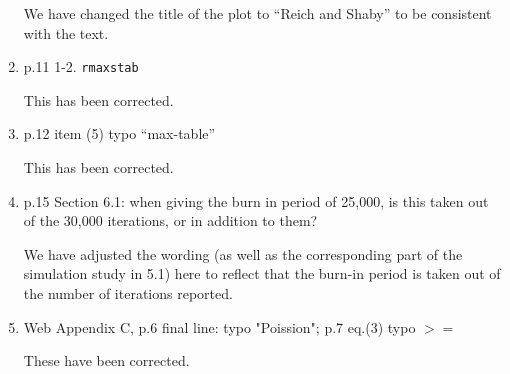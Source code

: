 \documentclass[11pt]{article}
\begin{document}
\begin{enumerate}[1.]
	\begin{response}
	We have changed the title of the plot to ``Reich and Shaby'' to be consistent with the text.
	\end{response}
	
	\item p.11 1-2. \texttt{rmaxstab}
	
	\begin{response}
	This has been corrected.
	\end{response}
	
	\item p.12 item (5) typo ``max-table''
	
	\begin{response}
	This has been corrected.
	\end{response}
	
	\item p.15 Section 6.1: when giving the burn in period of 25,000, is this taken out of the 30,000 iterations, or in addition to them?
	
	\begin{response}
	We have adjusted the wording (as well as the corresponding part of the simulation study in 5.1) here to reflect that the burn-in period is taken out of the number of iterations reported.
	\end{response}
	
	\item Web Appendix C, p.6 final line: typo "Poission"; p.7 eq.(3) typo $>=$
	
	\begin{response}
	These have been corrected.		
	\end{response}

\end{enumerate}


\end{document}
